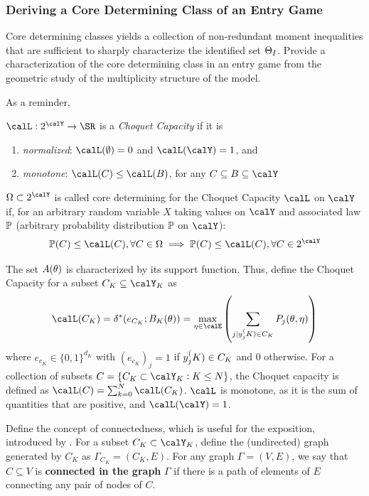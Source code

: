 \subsubsection{Deriving a Core Determining Class of an Entry Game}

Core determining classes yields a collection of non-redundant moment inequalities that are sufficient to sharply characterize the identified set $\T_I$. Provide a characterization of the core determining class in an entry game from the geometric study of the multiplicity structure of the model. 

As a reminder, 
\begin{definition}
	\label{def:BK-2}
	$\calL: 2^\calY \to \SR$ is a \emph{Choquet Capacity} if it is 
	\begin{enumerate}
		\item \emph{normalized}: $\calL(\emptyset) = 0$ and $\calL(\calY) = 1$, and 
		\item \emph{monotone}: $\calL(C) \leq \calL(B)$, for any $C\subseteq B\subseteq \calY$
	\end{enumerate}
\end{definition}

\begin{definition}
	\label{def:BK-3}
	$\Omega \subset 2^\calY$ is called core determining for the Choquet Capacity $\calL$ on $\calY$ if, for an arbitrary random variable $X$ taking values on $\calY$ and associated law $\P$ (arbitrary probability distribution $\P$ on $\calY$):
	\[\P(C) \leq \calL(C), \forall C\in\Omega \implies \P(C) \leq \calL(C), \forall C \in 2^\calY\]
\end{definition}

The set $A(\t)$ is characterized by its support function. Thus, define the Choquet Capacity for a subset $C_K \subseteq \calY_K$ as
\begin{equation}
	\label{eq:BK-10}
 	\calL(C_K) = \delta^*(e_{C_K}; B_K(\theta)) = \max_{\eta\in\calE}\left(\sum_{j|y_j^\PK \in C_K} P_j(\t,\eta)\right)
 \end{equation} 
where $e_{c_K} \in \{0,1\}^{d_K}$ with $(e_{c_K})_j = 1$ if $y_j^\PK \in C_K$ and 0 otherwise. For a collection of subsets $C = \{C_K \subset \calY_K: K \leq N\}$, the Choquet capacity is defined as $\calL(C) = \sum_{k=0}^N \calL(C_K)$. $\calL$ is monotone, as it is the sum of quantities that are positive, and $\calL(\calY) = 1$. 

Define the concept of connectedness, which is useful for the exposition, introduced by \citet{GH-2011}. For a subset $C_K \subset \calY_K$, define the (undirected) graph generated by $C_K$ as $\Gamma_{C_K} = (C_K, E)$. For any graph $\Gamma = (V, E)$, we say that $C \subseteq V$ is \textbf{connected in the graph} $\Gamma$ if there is a path of elements of $E$ connecting any pair of nodes of $C$. 

